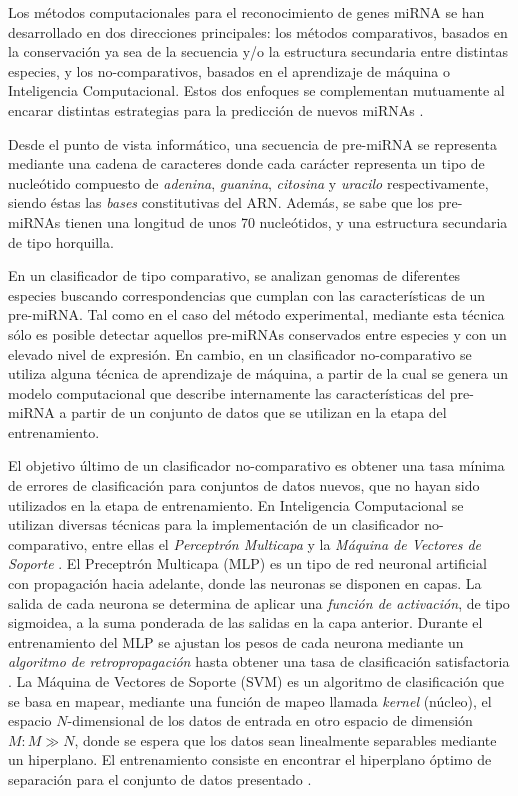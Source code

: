 \documentclass[12pt,bibliography=oldstyle,DIV=12,parskip=full-]{scrartcl}
\begin{document}
Los métodos computacionales para el reconocimiento de genes miRNA se
han desarrollado en dos direcciones principales: los métodos
comparativos, basados en la conservación ya sea de la secuencia y/o la
estructura secundaria entre distintas especies, y los no-comparativos,
basados en el aprendizaje de máquina o Inteligencia
Computacional. Estos dos enfoques se complementan mutuamente al
encarar distintas estrategias para la predicción de nuevos
miRNAs \cite{batuwita}\cite{sheng}.


Desde el punto de vista informático, una secuencia de pre-miRNA se
representa mediante una cadena de caracteres  donde
cada carácter representa un tipo de nucleótido compuesto de
\emph{adenina}, \emph{guanina}, \emph{citosina} y \emph{uracilo}
respectivamente, siendo éstas las \emph{bases} constitutivas del
ARN. Además, se sabe que los pre-miRNAs tienen una longitud de unos 70
nucleótidos, y una estructura secundaria de tipo horquilla.

En un clasificador de tipo comparativo, se analizan genomas de
diferentes especies buscando correspondencias que cumplan con las
características de un pre-miRNA. Tal como en el caso del método
experimental, mediante esta técnica sólo es posible detectar aquellos
pre-miRNAs conservados entre especies y con un elevado nivel de
expresión. En cambio, en un clasificador no-comparativo se utiliza
alguna técnica de aprendizaje de máquina, a partir de la cual se
genera un modelo computacional que describe internamente las
características del pre-miRNA a partir de un conjunto de datos que se
utilizan en la etapa del entrenamiento.

El objetivo último de un clasificador no-comparativo es obtener una
tasa mínima de errores de clasificación para conjuntos de datos
nuevos, que no hayan sido utilizados en la etapa de entrenamiento.
En Inteligencia Computacional se utilizan diversas técnicas para
la implementación de un clasificador no-comparativo, entre ellas
 el \emph{Perceptrón Multicapa} \cite{mlp1}\cite{mlp2} y la
\emph{Máquina de Vectores de Soporte} \cite{svm}.
El Preceptrón Multicapa (MLP) es un tipo de red neuronal artificial
con propagación hacia adelante, donde las neuronas se disponen en
capas.  La salida de cada neurona se determina de aplicar una
\emph{función de activación}, de tipo sigmoidea, a la suma ponderada
de las salidas en la capa anterior. Durante el entrenamiento del MLP
se ajustan los pesos de cada neurona mediante un \emph{algoritmo de
  retropropagación} hasta obtener una tasa de clasificación
satisfactoria \cite{jain}. 
La Máquina de Vectores de Soporte (SVM) es un algoritmo de
clasificación que se basa en mapear, mediante una función de mapeo
llamada \emph{kernel} (núcleo), el espacio $N$-dimensional de los
datos de entrada en otro espacio de dimensión $M: M\gg N$, donde se
espera que los datos sean linealmente separables mediante un
hiperplano. El entrenamiento consiste en encontrar el hiperplano
óptimo de separación para el conjunto de datos presentado \cite{bottou}.
\end{document}
